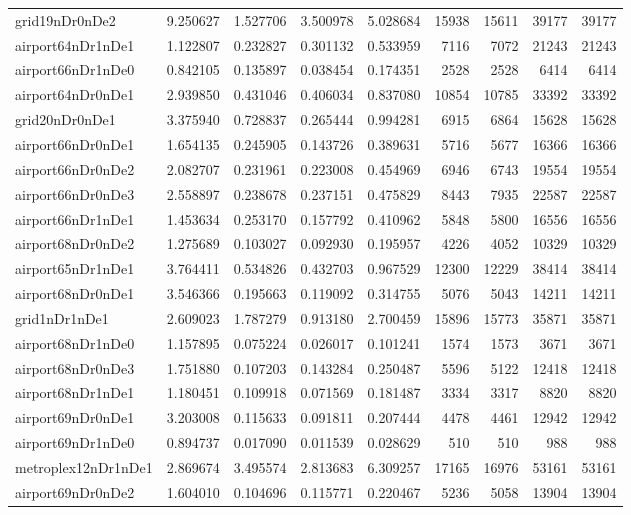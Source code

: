 \begin{longtable}{|l|r|r|r|r|r|r|r|r|}
grid19nDr0nDe2 & 9.250627 & 1.527706 & 3.500978 & 5.028684 & 15938 & 15611 & 39177 & 39177 \\
airport64nDr1nDe1 & 1.122807 & 0.232827 & 0.301132 & 0.533959 & 7116 & 7072 & 21243 & 21243 \\
airport66nDr1nDe0 & 0.842105 & 0.135897 & 0.038454 & 0.174351 & 2528 & 2528 & 6414 & 6414 \\
airport64nDr0nDe1 & 2.939850 & 0.431046 & 0.406034 & 0.837080 & 10854 & 10785 & 33392 & 33392 \\
grid20nDr0nDe1 & 3.375940 & 0.728837 & 0.265444 & 0.994281 & 6915 & 6864 & 15628 & 15628 \\
airport66nDr0nDe1 & 1.654135 & 0.245905 & 0.143726 & 0.389631 & 5716 & 5677 & 16366 & 16366 \\
airport66nDr0nDe2 & 2.082707 & 0.231961 & 0.223008 & 0.454969 & 6946 & 6743 & 19554 & 19554 \\
airport66nDr0nDe3 & 2.558897 & 0.238678 & 0.237151 & 0.475829 & 8443 & 7935 & 22587 & 22587 \\
airport66nDr1nDe1 & 1.453634 & 0.253170 & 0.157792 & 0.410962 & 5848 & 5800 & 16556 & 16556 \\
airport68nDr0nDe2 & 1.275689 & 0.103027 & 0.092930 & 0.195957 & 4226 & 4052 & 10329 & 10329 \\
airport65nDr1nDe1 & 3.764411 & 0.534826 & 0.432703 & 0.967529 & 12300 & 12229 & 38414 & 38414 \\
airport68nDr0nDe1 & 3.546366 & 0.195663 & 0.119092 & 0.314755 & 5076 & 5043 & 14211 & 14211 \\
grid1nDr1nDe1 & 2.609023 & 1.787279 & 0.913180 & 2.700459 & 15896 & 15773 & 35871 & 35871 \\
airport68nDr1nDe0 & 1.157895 & 0.075224 & 0.026017 & 0.101241 & 1574 & 1573 & 3671 & 3671 \\
airport68nDr0nDe3 & 1.751880 & 0.107203 & 0.143284 & 0.250487 & 5596 & 5122 & 12418 & 12418 \\
airport68nDr1nDe1 & 1.180451 & 0.109918 & 0.071569 & 0.181487 & 3334 & 3317 & 8820 & 8820 \\
airport69nDr0nDe1 & 3.203008 & 0.115633 & 0.091811 & 0.207444 & 4478 & 4461 & 12942 & 12942 \\
airport69nDr1nDe0 & 0.894737 & 0.017090 & 0.011539 & 0.028629 & 510 & 510 & 988 & 988 \\
metroplex12nDr1nDe1 & 2.869674 & 3.495574 & 2.813683 & 6.309257 & 17165 & 16976 & 53161 & 53161 \\
airport69nDr0nDe2 & 1.604010 & 0.104696 & 0.115771 & 0.220467 & 5236 & 5058 & 13904 & 13904 \\

\end{longtable}
